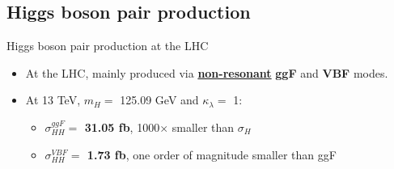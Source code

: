 \subsection{Higgs boson pair production}

\begin{frame}{Higgs boson pair production at the LHC}

\begin{itemize}
    \item At the LHC, mainly produced via \textbf{\underline{non-resonant}} \textbf{\textcolor{HHred}{ggF}} and \textbf{\textcolor{HHturquoise_d}{VBF}} modes. 
\end{itemize}

\begin{figure}
\end{figure}




\begin{itemize}
    \item At 13 TeV, $m_{H} = $ 125.09 GeV and $\kappa_{\lambda} = $ 1: 
    \begin{itemize}
        \item \textcolor{HHred}{\textbf{$\sigma^{ggF}_{HH} = $ 31.05 fb}}, 1000$\times$ smaller than $\sigma_{H}$
        \item \textcolor{HHturquoise_d}{\textbf{$\sigma^{VBF}_{HH} = $ 1.73 fb}}, one order of magnitude smaller than ggF
    \end{itemize}
\end{itemize}

\end{frame}

